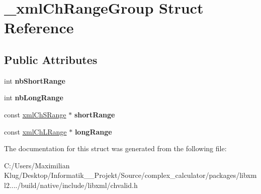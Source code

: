 \hypertarget{struct__xml_ch_range_group}{}\section{\+\_\+xml\+Ch\+Range\+Group Struct Reference}
\label{struct__xml_ch_range_group}
\subsection*{Public Attributes}
\begin{DoxyCompactItemize}
\item 
\mbox{\label{struct__xml_ch_range_group_a586ec6ff0df5781a799120268c917581}} 
int {\bfseries nb\+Short\+Range}
\item 
\mbox{\label{struct__xml_ch_range_group_a8c00ae5937f0d5489444fd8c264f7640}} 
int {\bfseries nb\+Long\+Range}
\item 
\mbox{\label{struct__xml_ch_range_group_aedd6b0cbe54821910877e37a34c6ab38}} 
const \mbox{\hyperlink{struct__xml_ch_s_range}{xml\+Ch\+S\+Range}} $\ast$ {\bfseries short\+Range}
\item 
\mbox{\label{struct__xml_ch_range_group_a17b011e8ac3510579c3f59bc82960c34}} 
const \mbox{\hyperlink{struct__xml_ch_l_range}{xml\+Ch\+L\+Range}} $\ast$ {\bfseries long\+Range}
\end{DoxyCompactItemize}


The documentation for this struct was generated from the following file\+:\begin{DoxyCompactItemize}
\item 
C\+:/\+Users/\+Maximilian Klug/\+Desktop/\+Informatik\+\_\+\_\+\+Projekt/\+Source/complex\+\_\+calculator/packages/libxml2..../build/native/include/libxml/chvalid.\+h\end{DoxyCompactItemize}

